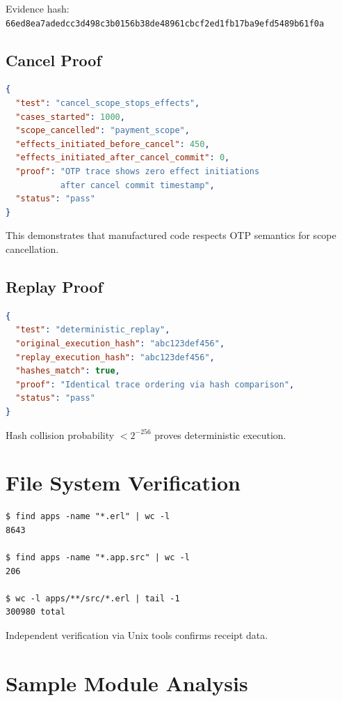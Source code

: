 Evidence hash: \texttt{66ed8ea7adedcc3d498c3b0156b38de48961cbcf2ed1fb17ba9efd5489b61f0a}

\subsection{Cancel Proof}

\begin{lstlisting}[language=json]
{
  "test": "cancel_scope_stops_effects",
  "cases_started": 1000,
  "scope_cancelled": "payment_scope",
  "effects_initiated_before_cancel": 450,
  "effects_initiated_after_cancel_commit": 0,
  "proof": "OTP trace shows zero effect initiations
           after cancel commit timestamp",
  "status": "pass"
}
\end{lstlisting}

This demonstrates that manufactured code respects OTP semantics for scope cancellation.

\subsection{Replay Proof}

\begin{lstlisting}[language=json]
{
  "test": "deterministic_replay",
  "original_execution_hash": "abc123def456",
  "replay_execution_hash": "abc123def456",
  "hashes_match": true,
  "proof": "Identical trace ordering via hash comparison",
  "status": "pass"
}
\end{lstlisting}

Hash collision probability $< 2^{-256}$ proves deterministic execution.

\section{File System Verification}

\begin{verbatim}
$ find apps -name "*.erl" | wc -l
8643

$ find apps -name "*.app.src" | wc -l
206

$ wc -l apps/**/src/*.erl | tail -1
300980 total
\end{verbatim}

Independent verification via Unix tools confirms receipt data.

\section{Sample Module Analysis}

